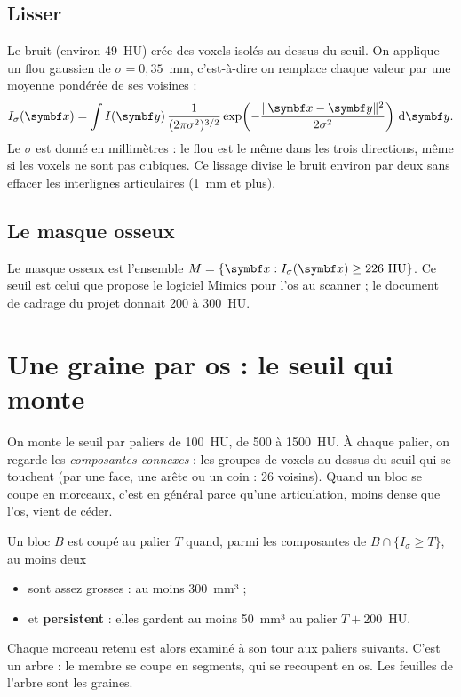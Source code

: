 \subsection{Lisser}

Le bruit (environ 49~HU) crée des voxels isolés au-dessus du seuil. On applique un flou gaussien de
$\sigma = 0{,}35$~mm, c'est-à-dire on remplace chaque valeur par une moyenne pondérée de ses voisines :
\begin{equation}
  I_\sigma(\vb{x}) = \int I(\vb{y})\, \frac{1}{(2\pi\sigma^2)^{3/2}} \exp\!\left(-\frac{\norm{\vb{x}-\vb{y}}^2}{2\sigma^2}\right) \dd\vb{y}.
\end{equation}
Le $\sigma$ est donné en millimètres : le flou est le même dans les trois directions, même si les voxels ne sont pas
cubiques. Ce lissage divise le bruit environ par deux sans effacer les interlignes articulaires (1~mm et plus).

\subsection{Le masque osseux}

Le masque osseux est l'ensemble $M = \{\vb{x} : I_\sigma(\vb{x}) \geq 226~\mathrm{HU}\}$. Ce seuil est celui que
propose le logiciel Mimics pour l'os au scanner ; le document de cadrage du projet donnait 200 à 300~HU.

\section{Une graine par os : le seuil qui monte}
\label{sec:graines}

On monte le seuil par paliers de 100~HU, de 500 à 1500~HU. À chaque palier, on regarde les \emph{composantes
connexes} : les groupes de voxels au-dessus du seuil qui se touchent (par une face, une arête ou un coin : 26
voisins). Quand un bloc se coupe en morceaux, c'est en général parce qu'une articulation, moins dense que l'os, vient
de céder.

Un bloc $B$ est coupé au palier $T$ quand, parmi les composantes de $B \cap \{I_\sigma \geq T\}$, au moins deux
\begin{itemize}
  \item sont assez grosses : au moins 300~mm³ ;
  \item et \textbf{persistent} : elles gardent au moins 50~mm³ au palier $T + 200$~HU.
\end{itemize}
Chaque morceau retenu est alors examiné à son tour aux paliers suivants. C'est un arbre : le membre se coupe en
segments, qui se recoupent en os. Les feuilles de l'arbre sont les graines.

